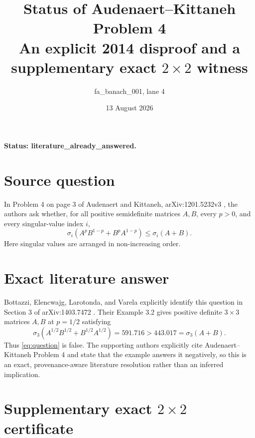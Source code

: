\documentclass[11pt]{article}
\title{Status of Audenaert--Kittaneh Problem 4\\
\large An explicit 2014 disproof and a supplementary exact $2\times2$ witness}
\author{fa\_banach\_001, lane 4}
\date{13 August 2026}
\begin{document}
\maketitle

\textbf{Status: literature\_already\_answered.}

\section*{Source question}

In Problem 4 on page 3 of Audenaert and Kittaneh, arXiv:1201.5232v3 \cite{AK}, the authors ask whether, for all positive semidefinite matrices $A,B$, every $p>0$, and every singular-value index $i$,
\begin{equation}\label{eq:question}
 \sigma_i\!\left(A^pB^{1-p}+B^pA^{1-p}\right)
 \leq \sigma_i(A+B).
\end{equation}
Here singular values are arranged in non-increasing order.

\section*{Exact literature answer}

Bottazzi, Elencwajg, Larotonda, and Varela explicitly identify this question in Section 3 of arXiv:1403.7472 \cite{BELV}. Their Example 3.2 gives positive definite $3\times3$ matrices $A,B$ at $p=1/2$ satisfying
\[
 \sigma_3\!\left(A^{1/2}B^{1/2}+B^{1/2}A^{1/2}\right)
 =591.716>443.017=\sigma_3(A+B).
\]
Thus \eqref{eq:question} is false. The supporting authors explicitly cite Audenaert--Kittaneh Problem 4 and state that the example answers it negatively, so this is an exact, provenance-aware literature resolution rather than an inferred implication.

\section*{Supplementary exact $2\times2$ certificate}
\end{document}
